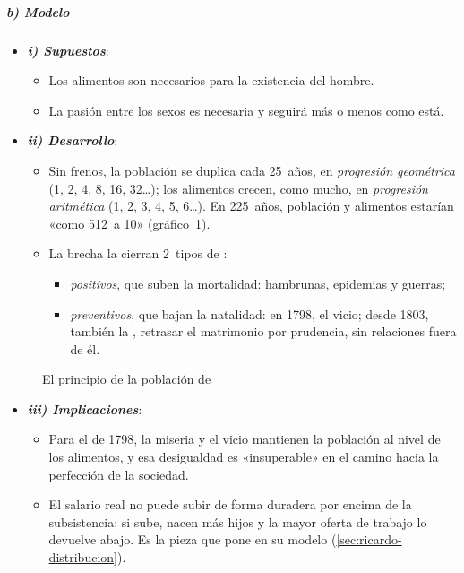 \documentclass[11pt]{article}
\begin{document}
\subparagraph{b) Modelo}
\begin{itemize}
\item \textbf{\emph{i) Supuestos}}:
  \begin{itemize}
  \item Los alimentos son necesarios para la existencia del hombre.
  \item La pasión entre los sexos es necesaria y seguirá más o menos como está\nocite{Malthus1798Essay}.
  \end{itemize}
\item \textbf{\emph{ii) Desarrollo}}:
  \begin{itemize}
  \item Sin frenos, la población se duplica cada 25~años, en \emph{progresión geométrica} (1, 2, 4, 8, 16, 32…); los alimentos crecen, como mucho, en \emph{progresión aritmética} (1, 2, 3, 4, 5, 6…). En 225~años, población y alimentos estarían «como 512~a 10»\nocite{Malthus1798Essay} (gráfico~\ref{fig:malthus}).
  \item La brecha la cierran 2~tipos de :
    \begin{itemize}
    \item \emph{positivos}, que suben la mortalidad: hambrunas, epidemias y guerras;
    \item \emph{preventivos}, que bajan la natalidad: en 1798, el vicio; desde 1803, también la , retrasar el matrimonio por prudencia, sin relaciones fuera de él\nocite{Malthus1826Essay}.
    \end{itemize}
  \end{itemize}
\end{itemize}
\begin{figure}[H]
\centering
\caption{El principio de la población de }\label{fig:malthus}
\end{figure}
\begin{itemize}
\item \textbf{\emph{iii) Implicaciones}}:
  \begin{itemize}
  \item Para el  de 1798, la miseria y el vicio mantienen la población al nivel de los alimentos, y esa desigualdad es «insuperable» en el camino hacia la perfección de la sociedad\nocite{Malthus1798Essay}.
  \item El salario real no puede subir de forma duradera por encima de la subsistencia: si sube, nacen más hijos y la mayor oferta de trabajo lo devuelve abajo. Es la pieza que  pone en su modelo (\ref{sec:ricardo-distribucion}).
  \end{itemize}
\end{itemize}
\end{document}
